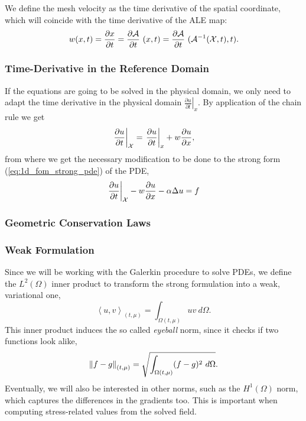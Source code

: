 \documentclass[../main.tex]{subfiles}
\newcommand{\inner}[2]{\left<#1, #2\right>}
\newcommand{\alemap}{\ensuremath{\mathcal{A}}}
\newcommand{\aleX}{\ensuremath{\mathcal{X}}}
\begin{document}
We define the mesh velocity as the time derivative of the spatial coordinate, which will coincide with the time derivative of the ALE map:
\begin{equation}
    w(x,t) = \pdv{x}{t} = \pdv{\alemap}{t} \ (x, t) = \pdv{\alemap}{t} \ (\alemap^{-1} (\aleX,t), t).
\end{equation}

\subsubsection*{Time-Derivative in the Reference Domain}
If the equations are going to be solved in the physical domain, we only need to adapt the time derivative in the physical domain $\left.\frac{\partial u}{\partial t}\right|_{x}$.
By application of the chain rule we get
\begin{equation}
    \left.\frac{\partial u}{\partial t}\right|_{\aleX} = 
    \left.\frac{\partial u}{\partial t}\right|_{x} + w \pdv{u}{x},
\end{equation}
from where we get the necessary modification to be done to the strong form (\ref{eq:1d_fom_strong_pde}) of the PDE, 
\begin{equation}
    \left.\frac{\partial u}{\partial t}\right|_{\aleX} - w \pdv{u}{x} - \alpha \Delta u = f
\end{equation}

\subsubsection*{Geometric Conservation Laws}


\subsubsection{Weak Formulation}
Since we will be working with the Galerkin procedure to solve PDEs, 
we define the $L^2(\Omega)$ inner product to transform the strong formulation into a weak, variational one,
\begin{equation}
    \inner{u}{v}_{(t, \mu)} = \int_{\Omega(t, \mu)} uv\ d\Omega.
\end{equation}
This inner product induces the so called \emph{eyeball} norm, since it checks if two functions look alike,
\begin{equation}
    \norm{f-g}_{(t, \mu)}  = \sqrt{\int_{\Omega(t, \mu)} (f - g)^2\ d\Omega}.
\end{equation}
Eventually, we will also be interested in other norms, such as the $H^1(\Omega)$ norm, which captures the differences in the gradients too.
This is important when computing stress-related values from the solved field.
\end{document}
